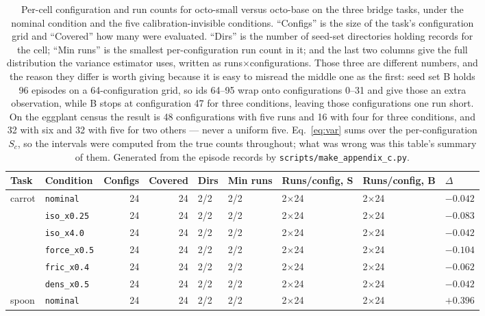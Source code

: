 \documentclass[pdflatex,iicol,sn-apa]{sn-jnl}
\theoremstyle{remark}
\begin{document}
\begin{appendices}
\begin{table}[t]
\caption{Per-cell configuration and run counts for octo-small versus octo-base on the three bridge
tasks, under the nominal condition and the five calibration-invisible conditions. ``Configs'' is the
size of the task's configuration grid and ``Covered'' how many were evaluated. ``Dirs'' is the number
of seed-set directories holding records for the cell; ``Min runs'' is the smallest per-configuration
run count in it; and the last two columns give the full distribution the variance estimator uses,
written as runs$\times$configurations. Those three are different numbers, and the reason they differ
is worth giving because it is easy to misread the middle one as the first: seed set B holds
96 episodes on a 64-configuration grid, so ids 64--95 wrap onto configurations 0--31 and give those
an extra observation, while B stops at configuration 47 for three conditions, leaving those
configurations one run short. On the eggplant census the result
is 48 configurations with five runs and 16 with four for three conditions, and 32 with six and 32
with five for two others --- never a uniform five. Eq.~\eqref{eq:var} sums over the per-configuration
$S_c$, so the intervals were computed from the true counts throughout; what was wrong was this
table's summary of them. Generated
from the episode records by \texttt{scripts/make\_appendix\_c.py}.}\label{tabC1}
\centering
\small
\begin{tabular}{@{}llrrlllll@{}}
\toprule
Task & Condition & Configs & Covered & Dirs & Min runs & Runs/config, S & Runs/config, B & $\Delta$ \\
\midrule
carrot & \texttt{nominal} & 24 & 24 & 2/2 & 2/2 & 2$\times$24 & 2$\times$24 & $-0.042$ \\
 & \texttt{iso\_x0.25} & 24 & 24 & 2/2 & 2/2 & 2$\times$24 & 2$\times$24 & $-0.083$ \\
 & \texttt{iso\_x4.0} & 24 & 24 & 2/2 & 2/2 & 2$\times$24 & 2$\times$24 & $-0.042$ \\
 & \texttt{force\_x0.5} & 24 & 24 & 2/2 & 2/2 & 2$\times$24 & 2$\times$24 & $-0.104$ \\
 & \texttt{fric\_x0.4} & 24 & 24 & 2/2 & 2/2 & 2$\times$24 & 2$\times$24 & $-0.062$ \\
 & \texttt{dens\_x0.5} & 24 & 24 & 2/2 & 2/2 & 2$\times$24 & 2$\times$24 & $-0.042$ \\
\midrule
spoon & \texttt{nominal} & 24 & 24 & 2/2 & 2/2 & 2$\times$24 & 2$\times$24 & $+0.396$ \\

\end{tabular}
\end{table}
\end{appendices}
\end{document}
